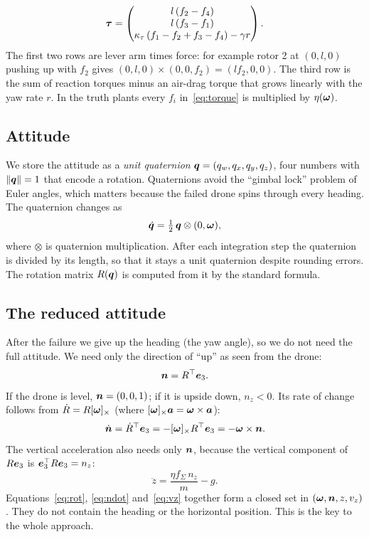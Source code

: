 \begin{equation}\label{eq:torque}
  \boldsymbol{\tau} = \begin{pmatrix} l\,(f_2 - f_4) \\ l\,(f_3 - f_1) \\ \kappa_\tau\,(f_1 - f_2 + f_3 - f_4) - \gamma r \end{pmatrix}.
\end{equation}
The first two rows are lever arm times force: for example rotor 2 at $(0,l,0)$ pushing up with $f_2$ gives $(0,l,0)\times(0,0,f_2) = (l f_2, 0, 0)$. The third row is the sum of reaction torques minus an air-drag torque that grows linearly with the yaw rate $r$. In the truth plants every $f_i$ in~\eqref{eq:torque} is multiplied by $\eta(\boldsymbol{\omega})$.

\subsection{Attitude}
We store the attitude as a \emph{unit quaternion} $\boldsymbol{q} = (q_w, q_x, q_y, q_z)$, four numbers with $\|\boldsymbol{q}\|=1$ that encode a rotation. Quaternions avoid the ``gimbal lock'' problem of Euler angles, which matters because the failed drone spins through every heading. The quaternion changes as
\begin{equation}
  \dot{\boldsymbol{q}} = \tfrac12\,\boldsymbol{q}\otimes(0,\boldsymbol{\omega}),
\end{equation}
where $\otimes$ is quaternion multiplication. After each integration step the quaternion is divided by its length, so that it stays a unit quaternion despite rounding errors. The rotation matrix $R(\boldsymbol{q})$ is computed from it by the standard formula.

\subsection{The reduced attitude}
After the failure we give up the heading (the yaw angle), so we do not need the full attitude. We need only the direction of ``up'' as seen from the drone:
\begin{equation}
  \boldsymbol{n} = R^\top\boldsymbol{e}_3 .
\end{equation}
If the drone is level, $\boldsymbol{n} = (0,0,1)$; if it is upside down, $n_z<0$. Its rate of change follows from $\dot R = R[\boldsymbol{\omega}]_\times$ (where $[\boldsymbol{\omega}]_\times\boldsymbol{a} = \boldsymbol{\omega}\times\boldsymbol{a}$):
\begin{equation}\label{eq:ndot}
  \dot{\boldsymbol{n}} = \dot R^\top\boldsymbol{e}_3 = -[\boldsymbol{\omega}]_\times R^\top \boldsymbol{e}_3 = -\boldsymbol{\omega}\times\boldsymbol{n} .
\end{equation}
The vertical acceleration also needs only $\boldsymbol{n}$, because the vertical component of $R\boldsymbol{e}_3$ is $\boldsymbol{e}_3^\top R\boldsymbol{e}_3 = n_z$:
\begin{equation}\label{eq:vz}
  \ddot z = \frac{\eta f_\Sigma\, n_z}{m} - g .
\end{equation}
Equations~\eqref{eq:rot}, \eqref{eq:ndot} and~\eqref{eq:vz} together form a closed set in $(\boldsymbol{\omega}, \boldsymbol{n}, z, v_z)$. They do not contain the heading or the horizontal position. This is the key to the whole approach.

